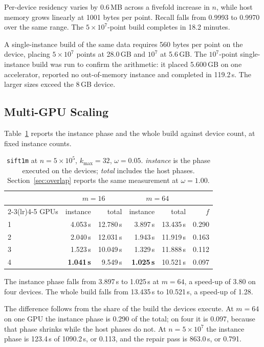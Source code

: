 \documentclass{ieeeaccess}
\newcommand{\kmax}{k_{\max}}
\begin{document}
Per-device residency varies by 0.6\,MB across a fivefold increase in $n$, while
host memory grows linearly at 1001 bytes per point. Recall falls from 0.9993 to
0.9970 over the same range. The $5\times10^7$-point build completes in 18.2
minutes.

A single-instance build of the same data requires 560 bytes per point on the
device, placing $5\times10^7$ points at 28.0\,GB and $10^7$ at 5.6\,GB. The
$10^7$-point single-instance build was run to confirm the arithmetic: it placed
5.600\,GB on one accelerator, reported no out-of-memory instance and completed
in 119.2\,s. The larger sizes exceed the 8\,GB device.

\subsection{Multi-GPU Scaling}
\label{sec:scaling}

Table~\ref{tab:scaling} reports the instance phase and the whole build against
device count, at fixed instance counts.

\begin{table}[!t]
\caption{\texttt{sift1m} at $n = 5\times10^5$, $\kmax = 32$, $\omega = 0.05$.
\emph{instance} is the phase executed on the devices; \emph{total} includes the
host phases. Section~\ref{sec:overlap} reports the same measurement at
$\omega = 1.00$.}
\label{tab:scaling}
\centering
\footnotesize
\begin{tabular}{@{}lrrrrr@{}}
\toprule
 & \multicolumn{2}{c}{$m = 16$} & \multicolumn{2}{c}{$m = 64$} & \\
\cmidrule(lr){2-3}\cmidrule(lr){4-5}
GPUs & instance & total & instance & total & $f$ \\
\midrule
1 & 4.053\,s & 12.780\,s & 3.897\,s & 13.435\,s & 0.290 \\
2 & 2.040\,s & 12.031\,s & 1.943\,s & 11.919\,s & 0.163 \\
3 & 1.523\,s & 10.049\,s & 1.329\,s & 11.888\,s & 0.112 \\
4 & \textbf{1.041\,s} & 9.549\,s & \textbf{1.025\,s} & 10.521\,s & 0.097 \\
\bottomrule
\end{tabular}
\end{table}

The instance phase falls from 3.897\,s to 1.025\,s at $m = 64$, a speed-up of
3.80 on four devices. The whole build falls from 13.435\,s to 10.521\,s, a
speed-up of 1.28.

The difference follows from the share of the build the devices execute. At
$m = 64$ on one GPU the instance phase is 0.290 of the total; on four it is
0.097, because that phase shrinks while the host phases do not. At
$n = 5\times10^7$ the instance phase is 123.4\,s of 1090.2\,s, or 0.113, and the
repair pass is 863.0\,s, or 0.791.
\end{document}
